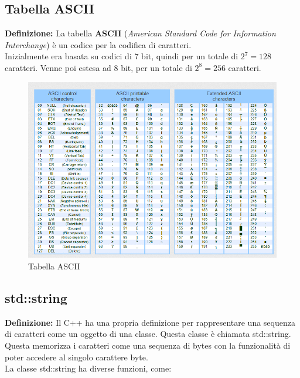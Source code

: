 \subsection{Tabella ASCII}

\textsf{\small \textbf{Definizione: } La tabella \textbf{ASCII} (\emph{American Standard Code for Information Interchange}) è un codice per la codifica di caratteri.} \\

\textsf{\small Inizialmente era basata su codici di 7 bit, quindi per un totale di $2^7 = 128$ caratteri. Venne poi estesa ad 8 bit, per un totale di $2^8 = 256$ caratteri.} \\

\begin{figure}[ht]
	\centering
	\includegraphics[width=1.2\textwidth, height=1.2\textheight, keepaspectratio]{./imgs/ascii_table2.png}
	\caption{Tabella ASCII}
	\label{fig:ascii_table}
\end{figure}

\subsection{std::string}

\textsf{\small \textbf{Definizione: } Il C++ ha una propria definizione per rappresentare una sequenza di caratteri come un oggetto di una classe. Questa classe è chiamata std::string. Questa memorizza i caratteri come una sequenza di bytes con la funzionalità di poter accedere al singolo carattere byte.} \\

\textsf{\small La classe std::string ha diverse funzioni, come: } 

